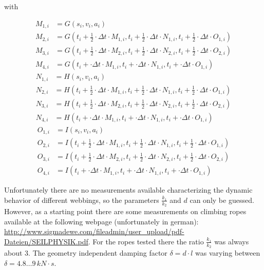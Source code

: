 with 

\begin{align}
	M_{1,i} &= G(s_i, v_i, a_i) \\
	M_{2,i} &= G \left(t_i + \frac{1}{2} \cdot \Delta t \cdot M_{1,i}, t_i + \frac{1}{2} \cdot \Delta t \cdot N_{1,i}, t_i + \frac{1}{2} \cdot \Delta t \cdot O_{1,i}\right) \\
	M_{3,i} &= G \left(t_i + \frac{1}{2} \cdot \Delta t \cdot M_{2,i}, t_i + \frac{1}{2} \cdot \Delta t \cdot N_{2,i}, t_i + \frac{1}{2} \cdot \Delta t \cdot O_{2,i}\right) \\
	M_{4,i} &= G \left(t_i + \cdot \Delta t \cdot M_{1,i}, t_i + \cdot \Delta t \cdot N_{1,i}, t_i +\cdot \Delta t \cdot O_{1,i}\right)
\end{align}
\begin{align}
N_{1,i} &= H(s_i, v_i, a_i) \\
N_{2,i} &= H \left(t_i + \frac{1}{2} \cdot \Delta t \cdot M_{1,i}, t_i + \frac{1}{2} \cdot \Delta t \cdot N_{1,i}, t_i + \frac{1}{2} \cdot \Delta t \cdot O_{1,i}\right) \\
N_{3,i} &= H \left(t_i + \frac{1}{2} \cdot \Delta t \cdot M_{2,i}, t_i + \frac{1}{2} \cdot \Delta t \cdot N_{2,i}, t_i + \frac{1}{2} \cdot \Delta t \cdot O_{2,i}\right) \\
N_{4,i} &= H \left(t_i + \cdot \Delta t \cdot M_{1,i}, t_i + \cdot \Delta t \cdot N_{1,i}, t_i +\cdot \Delta t \cdot O_{1,i}\right)
\end{align}
\begin{align}
O_{1,i} &= I(s_i, v_i, a_i) \\
O_{2,i} &= I \left(t_i + \frac{1}{2} \cdot \Delta t \cdot M_{1,i}, t_i + \frac{1}{2} \cdot \Delta t \cdot N_{1,i}, t_i + \frac{1}{2} \cdot \Delta t \cdot O_{1,i}\right) \\
O_{3,i} &= I \left(t_i + \frac{1}{2} \cdot \Delta t \cdot M_{2,i}, t_i + \frac{1}{2} \cdot \Delta t \cdot N_{2,i}, t_i + \frac{1}{2} \cdot \Delta t \cdot O_{2,i}\right) \\
O_{4,i} &= I \left(t_i + \cdot \Delta t \cdot M_{1,i}, t_i + \cdot \Delta t \cdot N_{1,i}, t_i +\cdot \Delta t \cdot O_{1,i}\right)
\end{align}


Unfortunately there are no measurements available characterizing the dynamic behavior of different webbings, so the parameters $\frac{k_1}{k_2}$ and $d$ can only be guessed. However, as a starting point there are some measurements on climbing ropes available at the following webpage (unfortunately in german): \url{http://www.sigmadewe.com/fileadmin/user_upload/pdf-Dateien/SEILPHYSIK.pdf}.
For the ropes tested there the ratio $\frac{k_1}{k_2}$ was always about $3$. The geometry independent damping factor $\delta = d \cdot l$ was varying between $\delta = 4.8 \dots 9\,kN\cdot s$.
